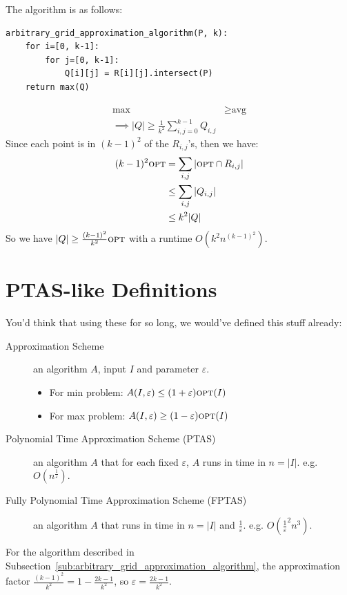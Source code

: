                     The algorithm is as follows:
                    \begin{lstlisting}
arbitrary_grid_approximation_algorithm(P, k):
    for i=[0, k-1]:
        for j=[0, k-1]:
            Q[i][j] = R[i][j].intersect(P)
    return max(Q)
                    \end{lstlisting}
                    \begin{align*}
                        \max &\ge \text{avg} \\
                        \implies |Q| \ge \frac{1}{k^2} \sum_{i,j=0}^{k-1} Q_{i, j}
                    \end{align*}
                    Since each point is in $(k-1)^2$ of the $R_{i,j}$'s, then we have:
                    \begin{align*}
                        (k-1)^2 \textsc{opt} &= \sum_{i,j} | \textsc{opt} \cap R_{i, j} | \\
                        &\le \sum_{i, j} | Q_{i, j} | \\
                        &\le k^2 | Q |
                    \end{align*}
                    So we have $|Q| \ge \frac{(k-1)^2}{k^2}\textsc{opt}$ with a runtime $O(k^2 n^{(k-1)^2})$.
            \section{PTAS-like Definitions} %
            \label{sec:ptas_like_definitions}
                You'd think that using these for so long, we would've defined this stuff already:
                \begin{description}
                    \item[Approximation Scheme] an algorithm $A$, input $I$ and parameter $\varepsilon$.
                        \begin{itemize}
                            \item For min problem: $A(I, \varepsilon) \le (1 + \varepsilon) \textsc{opt}(I)$
                            \item For max problem: $A(I, \varepsilon) \ge (1 - \varepsilon) \textsc{opt}(I)$
                        \end{itemize}
                    \item[Polynomial Time Approximation Scheme (PTAS)] an algorithm $A$ that for each fixed $\varepsilon$, $A$ runs in \p time in $n = |I|$.
                    e.g. $O(n^\frac{1}{\varepsilon})$.
                    \item[Fully Polynomial Time Approximation Scheme (FPTAS)] an algorithm $A$ that runs in \p time in $n = |I|$ and $\frac{1}{\varepsilon}$.
                    e.g. $O(\frac{1}{\varepsilon}^2 n^3)$.
                \end{description}
                For the algorithm described in Subsection~\ref{sub:arbitrary_grid_approximation_algorithm}, the approximation factor $\frac{(k-1)^2}{k^2} = 1 - \frac{2k - 1}{k^2}$, so $\varepsilon = \frac{2k - 1}{k^2}$.

